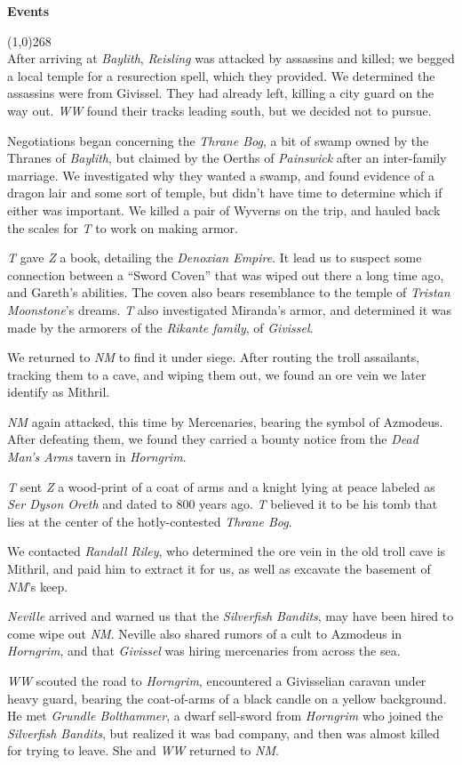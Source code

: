 \documentclass[letterpaper]{article}
\newcommand{\colline}{\line(1,0){268} \\}
\newcommand{\e}[1]{\emph{#1}}
\newcommand{\B}[1]{\textbf{#1}}
\newenvironment{notesection}[1]
{ {\huge \B{#1}} \par
\vspace{-0.75em}
\colline
\begingroup\fontsize{9pt}{12pt}\selectfont}
{\endgroup}
\begin{document}
\begin{notesection}{Events}
After arriving at \e{Baylith}, \e{Reisling} was attacked by assassins and killed; we begged a local temple for a resurection spell, which they provided. We determined the assassins were from Givissel. They had already left, killing a city guard on the way out.  \e{WW} found their tracks leading south, but we decided not to pursue.

Negotiations began concerning the \e{Thrane Bog}, a bit of swamp owned by the Thranes of \e{Baylith}, but claimed by the Oerths of \e{Painswick} after an inter-family marriage.  We investigated why they wanted a swamp, and found evidence of a dragon lair and some sort of temple, but didn't have time to determine which if either was important.  We killed a pair of Wyverns on the trip, and hauled back the scales for \e{T} to work on making armor.

\e{T} gave \e{Z} a book, detailing the \e{Denoxian Empire}. It lead us to suspect some connection between a ``Sword Coven'' that was wiped out there a long time ago, and Gareth's abilities. The coven also bears resemblance to the temple of \e{Tristan Moonstone}'s dreams. \e{T} also investigated Miranda's armor, and determined it was made by the armorers of the \e{Rikante family}, of \e{Givissel}.

We returned to \e{NM} to find it under siege. After routing the troll assailants, tracking them to a cave, and wiping them out, we found an ore vein we later identify as Mithril.

\e{NM} again attacked, this time by Mercenaries, bearing the symbol of Azmodeus.  After defeating them, we found they carried a bounty notice from the \e{Dead Man's Arms} tavern in \e{Horngrim}.

\e{T} sent \e{Z} a wood-print of a coat of arms and a knight lying at peace labeled as \e{Ser Dyson Oreth} and dated to 800 years ago.  \e{T} believed it to be his tomb that lies at the center of the hotly-contested \e{Thrane Bog}.

We contacted \e{Randall Riley}, who determined the ore vein in the old troll cave is Mithril, and paid him to extract it for us, as well as excavate the basement of \e{NM}'s keep.

\e{Neville} arrived and warned us that the \e{Silverfish Bandits}, may have been hired to come wipe out \e{NM}.  Neville also shared rumors of a cult to Azmodeus in \e{Horngrim}, and that \e{Givissel} was hiring mercenaries from across the sea.

\e{WW} scouted the road to \e{Horngrim}, encountered a Givisselian caravan under heavy guard, bearing the coat-of-arms of a black candle on a yellow background.  He met \e{Grundle Bolthammer}, a dwarf sell-sword from \e{Horngrim} who joined the \e{Silverfish Bandits}, but realized it was bad company, and then was almost killed for trying to leave. She and \e{WW} returned to \e{NM}.


\end{notesection}
\end{document}
